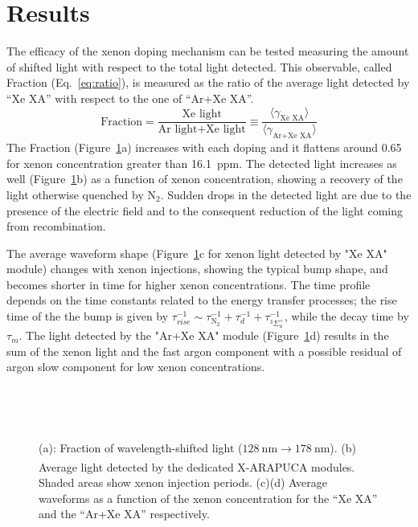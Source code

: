 \documentclass[a4paper]{article}
\begin{document}
\section{Results}
The efficacy of the xenon doping mechanism can be tested measuring the amount of shifted light with respect to the total light detected. This observable, called Fraction (Eq.~\ref{eq:ratio}), is measured as the ratio of the average light detected by ``Xe XA'' with respect to the one of ``Ar+Xe XA''.
\begin{equation}
\text{Fraction} = \frac{\text{Xe light}}{\text{Ar light} + \text{Xe light}} \equiv \frac{\langle \gamma_{\text{Xe XA}} \rangle}{\langle \gamma_{\text{Ar+Xe XA}} \rangle}
\label{eq:ratio}
\end{equation}
The Fraction (Figure~\ref{fig:XA-result}a) increases with each doping and it flattens around \num{0.65} for xenon concentration greater than \SI{16.1}{ppm}. The detected light increases as well (Figure~\ref{fig:XA-result}b) as a function of xenon concentration, showing a recovery of the light otherwise quenched by N$_2$. Sudden drops in the detected light are due to the presence of the electric field and to the consequent reduction of the light coming from recombination.

The average waveform shape (Figure~\ref{fig:XA-result}c for xenon light detected by "Xe XA" module) changes with xenon injections, showing the typical bump shape, and becomes shorter in time for higher xenon concentrations. The time profile depends on the time constants related to the energy transfer processes; the rise time of the the bump is given by $\tau_{rise}^{-1} \sim \tau_{\text{N}_2}^{-1} + \tau_d^{-1} + \tau_{^3\Sigma_u^+}^{-1}$, while the decay time by $\tau_m$. The light detected by the "Ar+Xe XA" module (Figure~\ref{fig:XA-result}d) results in the sum of the xenon light and the fast argon component with a possible residual of argon slow component for low xenon concentrations.

\begin{figure}
    \centering
    ~
    \vspace{-3mm}
    
    ~
    \caption{(a): Fraction of wavelength-shifted light ($\SI{128}{\nano\meter} \xrightarrow[]{} \SI{178}{\nano\meter}$). (b) Average light detected by the dedicated X-ARAPUCA modules. Shaded areas show xenon injection periods. (c)(d) Average waveforms as a function of the xenon concentration for the ``Xe XA'' and the ``Ar+Xe XA'' respectively.}
    \label{fig:XA-result}
\end{figure}
\end{document}
